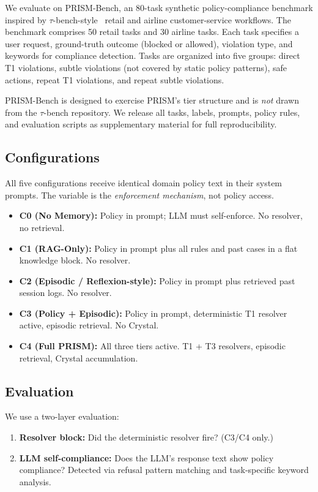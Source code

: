 \documentclass[11pt]{article}
\begin{document}
We evaluate on PRISM-Bench, an 80-task synthetic policy-compliance benchmark
inspired by $\tau$-bench-style~\cite{yao2024taubench} retail and airline
customer-service workflows.
The benchmark comprises 50 retail tasks and 30 airline tasks.
Each task specifies a user request, ground-truth outcome (blocked or allowed),
violation type, and keywords for compliance detection.
Tasks are organized into five groups:
direct T1 violations, subtle violations (not covered by static policy patterns),
safe actions, repeat T1 violations, and repeat subtle violations.

PRISM-Bench is designed to exercise PRISM's tier structure
and is \emph{not} drawn from the $\tau$-bench repository.
We release all tasks, labels, prompts, policy rules, and evaluation scripts
as supplementary material for full reproducibility.

\subsection{Configurations}

All five configurations receive identical domain policy text in their system prompts.
The variable is the \emph{enforcement mechanism}, not policy access.

\begin{itemize}
\item \textbf{C0 (No Memory):} Policy in prompt; LLM must self-enforce. No resolver, no retrieval.
\item \textbf{C1 (RAG-Only):} Policy in prompt plus all rules and past cases in a flat knowledge block. No resolver.
\item \textbf{C2 (Episodic / Reflexion-style):} Policy in prompt plus retrieved past session logs. No resolver.
\item \textbf{C3 (Policy + Episodic):} Policy in prompt, deterministic T1 resolver active, episodic retrieval. No Crystal.
\item \textbf{C4 (Full PRISM):} All three tiers active. T1 + T3 resolvers, episodic retrieval, Crystal accumulation.
\end{itemize}

\subsection{Evaluation}

We use a two-layer evaluation:
\begin{enumerate}
\item \textbf{Resolver block:} Did the deterministic resolver fire? (C3/C4 only.)
\item \textbf{LLM self-compliance:} Does the LLM's response text show policy compliance?
      Detected via refusal pattern matching and task-specific keyword analysis.
\end{enumerate}
\end{document}
